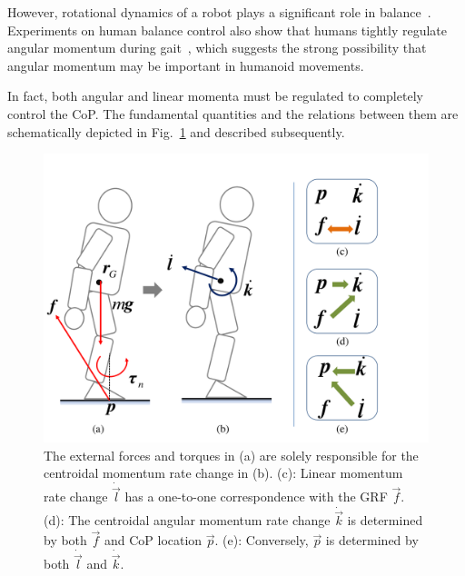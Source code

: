\documentclass{llncs}
\newcommand{\vp}{\vec{p}}
\newcommand{\vf}{\vec{f}}
\newcommand{\vdk} {\dot{\vec{k}}}
\newcommand{\vdl} {\dot{\vec{l}}}
\begin{document}
However, rotational dynamics of a robot plays a
significant role in balance~\cite{KLKK05}.
Experiments on human balance control also show that
humans tightly regulate angular momentum during gait~\cite{PHH04},
which suggests the strong possibility that angular momentum
may be important in humanoid movements.

In fact, both angular and linear momenta
must be regulated to completely control the CoP. The fundamental quantities and the
relations between them are schematically depicted in Fig.~\ref{fig:one2one} and described subsequently.
\begin{figure}[h]
\begin{center}
\includegraphics[width=0.5\columnwidth]{Figures/one2one_new_line.pdf}%
\caption{
The external forces and torques in (a) are solely responsible
for the centroidal momentum rate change in (b).
(c): Linear momentum rate change $\vdl$ has a one-to-one
correspondence with the GRF $\vf$.
(d): The centroidal angular momentum rate change $\vdk$
is determined by both $\vf$ and CoP location $\vp$.
(e): Conversely, $\vp$ is determined by both
$\vdl$ and $\vdk$. %
}
\label{fig:one2one}%
\end{center}
\end{figure}
\end{document}
